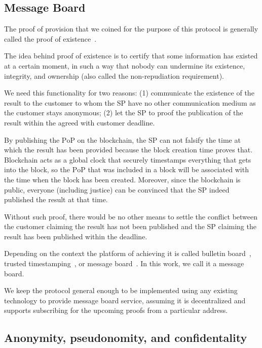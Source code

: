 \documentclass{ieeeaccess}
\begin{document}
\subsection{Message Board}\label{sec:message-board}
The proof of provision that we coined for the purpose of this protocol is generally called the proof of existence~\cite{ProofExistenceOnline, crespoStamperyBlockchainTimestamping2017, ChainpointBlockchainProof}.

The idea behind proof of existence is to certify that some information
has existed at a certain moment, in such a way that nobody can
undermine its existence, integrity, and ownership (also called the
non-repudiation requirement).


We need this functionality for two reasons: (1) communicate the existence of the result to the customer to whom the SP have no other communication medium as the customer stays anonymous; (2) let the SP to proof the publication of the result within the agreed with customer deadline. 

By publishing the $\mathrm{PoP}$ on the blockchain, the SP can not falsify the time at which the result has been provided because the block creation time proves that. Blockchain acts as a global clock that securely timestamps everything that gets into the block, so the $\mathrm{PoP}$ that was included in a block will be associated with the time when the block has been created. Moreover, since the blockchain is public, everyone (including justice) can be convinced that the SP indeed published the result at that time.

Without such proof, there would be no other means to settle the conflict between the customer claiming the result has not been published and the SP claiming the result has been published within the deadline.

Depending on the context the platform of achieving it is called bulletin board~\cite{achenbachImprovedCoercionresistantElectronic2015}, trusted timestamping~\cite{gippDecentralizedTrustedTimestamping2015}, or message board~\cite{hinarejosSolutionSecureCertified2019}. In this work, we call it a message board.

We keep the protocol general enough to be implemented using any existing technology to provide message board service, assuming it is decentralized and supports subscribing for the upcoming proofs from a particular address.

\subsection{Anonymity, pseudonomity, and confidentality}\label{sec:pseudo-anon}
\end{document}
